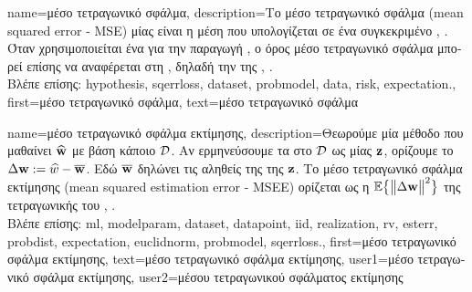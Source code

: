 {name={\foreignlanguage{greek}{μέσο τετραγωνικό σφάλμα}}, 
	description={\foreignlanguage{greek}{Το μέσο τετραγωνικό σφάλμα} 
		(mean squared error - MSE) \foreignlanguage{greek}{μίας}  \foreignlanguage{greek}{είναι η μέση}
         	 \foreignlanguage{greek}{που υπολογίζεται σε ένα συγκεκριμένο} 
		\cite{MLBasics}, \cite{hastie01statisticallearning}. 
		\foreignlanguage{greek}{Όταν χρησιμοποιείται ένα}  \foreignlanguage{greek}{για την παραγωγή} 
		, \foreignlanguage{greek}{ο όρος μέσο τετραγωνικό σφάλμα μπορεί επίσης να αναφέρεται στη}
		, \foreignlanguage{greek}{δηλαδή την}  \foreignlanguage{greek}{της} 
		 \cite{LC}, \cite{kay}.
		\\ 
		\foreignlanguage{greek}{Βλέπε επίσης:} \gls{hypothesis}, \gls{sqerrloss}, \gls{dataset}, \gls{probmodel}, \gls{data}, \gls{risk}, \gls{expectation}.}, 
 	first={\foreignlanguage{greek}{μέσο τετραγωνικό σφάλμα}}, 
 	text={\foreignlanguage{greek}{μέσο τετραγωνικό σφάλμα}}
}

{name={\foreignlanguage{greek}{μέσο τετραγωνικό σφάλμα εκτίμησης}},
	description={\foreignlanguage{greek}{Θεωρούμε μία μέθοδο} 
		 \foreignlanguage{greek}{που μαθαίνει}  $\widehat{{\bf w}}$ 
		\foreignlanguage{greek}{με βάση κάποιο}  $\mathcal{D}$. 
		\foreignlanguage{greek}{Αν ερμηνεύσουμε τα}  \foreignlanguage{greek}{στο} $\mathcal{D}$ 
		\foreignlanguage{greek}{ως}   \foreignlanguage{greek}{μίας}  ${\bf z}$, 
		\foreignlanguage{greek}{ορίζουμε το}  $\Delta {\bf w} := \widehat{w} - \overline{{\bf w}}$. 
		\foreignlanguage{greek}{Εδώ $\overline{{\bf w}}$ δηλώνει τις αληθείς}  \foreignlanguage{greek}{της} 
		 \foreignlanguage{greek}{της ${\bf z}$. Το μέσο τετραγωνικό σφάλμα εκτίμησης} 
		(mean squared estimation error - MSEE) \foreignlanguage{greek}{ορίζεται ως η}  
		$\mathbb{E} \big\{ \big\| \Delta {\bf w} \big\|^{2} \big\}$ \foreignlanguage{greek}{της τετραγωνικής}
		 \foreignlanguage{greek}{του}  \cite{LC}, \cite{kay}.
		\\
		\foreignlanguage{greek}{Βλέπε επίσης:} \gls{ml}, \gls{modelparam}, \gls{dataset}, \gls{datapoint}, \gls{iid}, \gls{realization}, \gls{rv}, 
		\gls{esterr}, \gls{probdist}, \gls{expectation}, \gls{euclidnorm},  \gls{probmodel}, \gls{sqerrloss}.},
	first={\foreignlanguage{greek}{μέσο τετραγωνικό σφάλμα εκτίμησης}},
	text={\foreignlanguage{greek}{μέσο τετραγωνικό σφάλμα εκτίμησης}},
	user1={\foreignlanguage{greek}{μέσο τετραγωνικό σφάλμα εκτίμησης}}, %
    	user2={\foreignlanguage{greek}{μέσου τετραγωνικού σφάλματος εκτίμησης}} %
}

